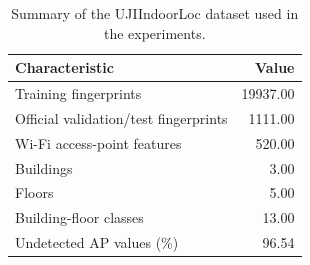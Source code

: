 \begin{table}
\caption{Summary of the UJIIndoorLoc dataset used in the experiments.}
\label{tab:dataset_characteristics}
\begin{tabular}{lr}
\toprule
Characteristic & Value \\
\midrule
Training fingerprints & 19937.00 \\
Official validation/test fingerprints & 1111.00 \\
Wi-Fi access-point features & 520.00 \\
Buildings & 3.00 \\
Floors & 5.00 \\
Building-floor classes & 13.00 \\
Undetected AP values (\%) & 96.54 \\
\bottomrule
\end{tabular}
\end{table}
